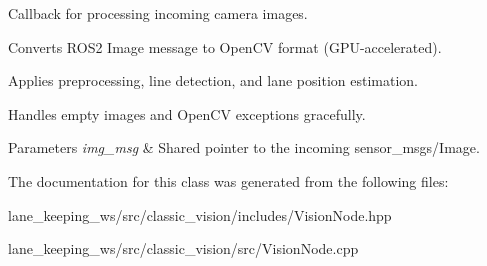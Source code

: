 Callback for processing incoming camera images. 


\begin{DoxyItemize}
\item Converts R\+O\+S2 Image message to Open\+CV format (G\+P\+U-\/accelerated).
\item Applies preprocessing, line detection, and lane position estimation.
\item Handles empty images and Open\+CV exceptions gracefully.
\end{DoxyItemize}


\begin{DoxyParams}{Parameters}
{\em img\+\_\+msg} & Shared pointer to the incoming sensor\+\_\+msgs/\+Image. \\
\hline
\end{DoxyParams}


The documentation for this class was generated from the following files\+:\begin{DoxyCompactItemize}
\item 
lane\+\_\+keeping\+\_\+ws/src/classic\+\_\+vision/includes/Vision\+Node.\+hpp\item 
lane\+\_\+keeping\+\_\+ws/src/classic\+\_\+vision/src/Vision\+Node.\+cpp\end{DoxyCompactItemize}
